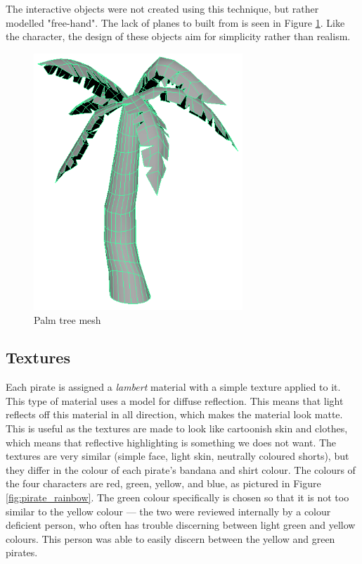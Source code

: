 The interactive objects were not created using this technique, but rather modelled "free-hand". The lack of planes to built from is seen in Figure \ref{fig:palmtree_mesh}. Like the character, the design of these objects aim for simplicity rather than realism.

\begin{figure}[h!]
	\centering
	\includegraphics[width=0.7\textwidth]{figures/palmtree_mesh.png}
	\caption{Palm tree mesh \label{fig:palmtree_mesh}}
\end{figure}

\subsection{Textures}
Each pirate is assigned a \textit{lambert} material with a simple texture applied to it. This type of material uses a model for diffuse reflection. This means that light reflects off this material in all direction, which makes the material look matte. This is useful as the textures are made to look like cartoonish skin and clothes, which means that reflective highlighting is something we does not want. The textures are very similar (simple face, light skin, neutrally coloured shorts), but they differ in the colour of each pirate's bandana and shirt colour. The colours of the four characters are red, green, yellow, and blue, as pictured in Figure \ref{fig:pirate_rainbow}. The green colour specifically is chosen so that it is not too similar to the yellow colour --- the two were reviewed internally by a colour deficient person, who often has trouble discerning between light green and yellow colours. This person was able to easily discern between the yellow and green pirates.

